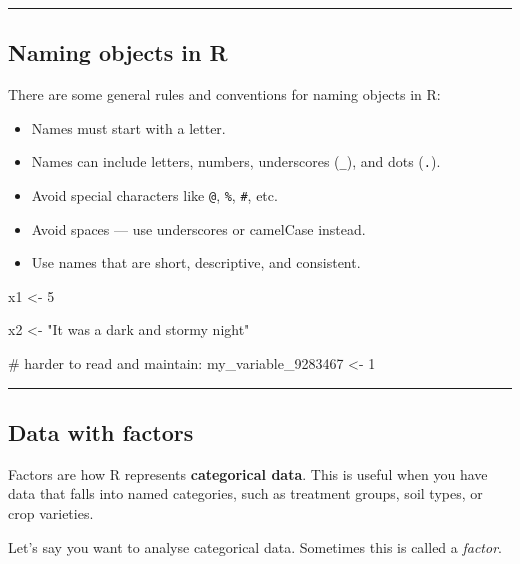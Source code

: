 \documentclass[
  letterpaper,
  DIV=11,
  numbers=noendperiod]{scrartcl}
\newenvironment{Shaded}{\begin{snugshade}}{\end{snugshade}}
\newcommand{\CommentTok}[1]{\textcolor[rgb]{0.37,0.37,0.37}{#1}}
\newcommand{\DecValTok}[1]{\textcolor[rgb]{0.68,0.00,0.00}{#1}}
\newcommand{\NormalTok}[1]{\textcolor[rgb]{0.00,0.23,0.31}{#1}}
\newcommand{\OtherTok}[1]{\textcolor[rgb]{0.00,0.23,0.31}{#1}}
\newcommand{\StringTok}[1]{\textcolor[rgb]{0.13,0.47,0.30}{#1}}
\providecommand{\tightlist}{%
  \setlength{\itemsep}{0pt}\setlength{\parskip}{0pt}}\usepackage{longtable,booktabs,array}
\begin{document}
\begin{center}\rule{0.5\linewidth}{0.5pt}\end{center}

\subsection{Naming objects in R}\label{naming-objects-in-r}

There are some general rules and conventions for naming objects in R:

\begin{itemize}
\tightlist
\item
  Names must start with a letter.
\item
  Names can include letters, numbers, underscores (\texttt{\_}), and
  dots (\texttt{.}).
\item
  Avoid special characters like \texttt{@}, \texttt{\%}, \texttt{\#},
  etc.
\item
  Avoid spaces --- use underscores or camelCase instead.
\item
  Use names that are short, descriptive, and consistent.
\end{itemize}

\begin{Shaded}
\begin{Highlighting}[]
\NormalTok{x1 }\OtherTok{\textless{}{-}} \DecValTok{5}  

\NormalTok{x2 }\OtherTok{\textless{}{-}} \StringTok{"It was a dark and stormy night"} 

\CommentTok{\# harder to read and maintain:}
\NormalTok{my\_variable\_9283467 }\OtherTok{\textless{}{-}} \DecValTok{1} 
\end{Highlighting}
\end{Shaded}

\begin{center}\rule{0.5\linewidth}{0.5pt}\end{center}

\subsection{Data with factors}\label{data-with-factors}

Factors are how R represents \textbf{categorical data}. This is useful
when you have data that falls into named categories, such as treatment
groups, soil types, or crop varieties.

Let's say you want to analyse categorical data. Sometimes this is called
a \emph{factor}.
\end{document}
